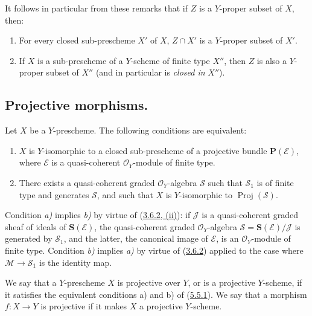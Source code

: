 It follows in particular from these remarks that if $Z$ is a
$Y$-proper subset of $X$, then:
\begin{enumerate}
  \item[\rm{1\textsuperscript{o}}] For every closed sub-prescheme $X'$ of
  $X$, $Z\cap X'$ is a $Y$-proper subset of $X'$.
  \item[\rm{2\textsuperscript{o}}] If $X$ is a sub-prescheme of a
  $Y$-scheme of finite type $X''$, then $Z$ is also a $Y$-proper subset of
  $X''$ (and in particular is \emph{closed in} $X''$).
\end{enumerate}


\subsection{Projective morphisms.}
\label{subsection:II.5.5}

\begin{proposition}[5.5.1]
\label{II.5.5.1}
Let $X$ be a $Y$-prescheme. The following conditions are equivalent:
\begin{enumerate}
  \item[\rm{a)}] $X$ is $Y$-isomorphic to a \textup{closed} sub-prescheme of a
  projective bundle $\mathbf{P}(\mathcal{E})$, where $\mathcal{E}$ is a
  quasi-coherent $\mathcal{O}_Y$-module of finite type.
  \item[\rm{b)}] There exists a quasi-coherent graded $\mathcal{O}_Y$-algebra
  $\mathcal{S}$ such that $\mathcal{S}_1$ is of finite type
  and generates $\mathcal{S}$, and such that $X$ is $Y$-isomorphic to
  $\operatorname{Proj}(\mathcal{S})$.
\end{enumerate}
\end{proposition}

Condition \emph{a)} implies \emph{b)} by virtue of
(\hyperref[II.3.6.2]{3.6.2, (ii)}): if $\mathcal{J}$ is a quasi-coherent
graded sheaf of ideals of $\mathbf{S}(\mathcal{E})$, the
quasi-coherent graded $\mathcal{O}_Y$-algebra
$\mathcal{S}=\mathbf{S}(\mathcal{E})/\mathcal{J}$ is generated by
$\mathcal{S}_1$, and the latter, the canonical image of $\mathcal{E}$, is an
$\mathcal{O}_Y$-module of finite type. Condition \emph{b)} implies \emph{a)} by virtue of
(\hyperref[II.3.6.2]{3.6.2}) applied to the case where
$\mathcal{M}\to\mathcal{S}_1$ is the identity map.


\begin{definition}[5.5.2]
\label{II.5.5.2}
We say that a $Y$-prescheme $X$ is projective over $Y$, or is a
projective $Y$-scheme, if it satisfies the equivalent conditions \textup{a)}
and \textup{b)} of (\hyperref[II.5.5.1]{5.5.1}). We say that a morphism $f:X\to Y$
is projective if it makes $X$ a projective $Y$-scheme.
\end{definition}

